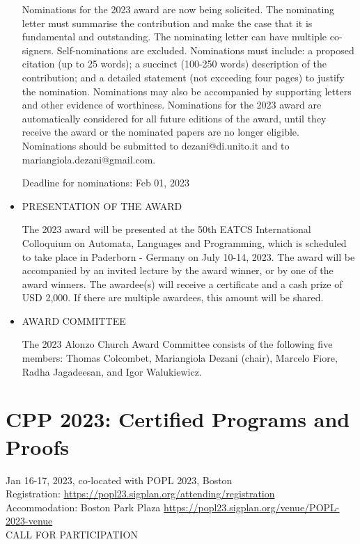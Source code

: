 \documentclass[prodmode,acmtecs]{acmsmall} %
\begin{document}
\begin{itemize}
  Nominations for the 2023 award are now being solicited. The nominating letter must summarise the contribution and make the case that it is fundamental and outstanding. The nominating letter can have multiple co-signers. Self-nominations are excluded. Nominations must include: a proposed citation (up to 25 words); a succinct (100-250 words) description of the contribution; and a detailed statement (not exceeding four pages) to justify the nomination. Nominations may also be accompanied by supporting letters and other evidence of worthiness. Nominations for the 2023 award are automatically considered for all future editions of the award, until they receive the award or the nominated papers are no longer eligible. Nominations should be submitted to dezani@di.unito.it and to mariangiola.dezani@gmail.com. 
 
Deadline for nominations: Feb 01, 2023 
 
\item  PRESENTATION OF THE AWARD 
 
  The 2023 award will be presented at the 50th EATCS International Colloquium on Automata, Languages and Programming, which is scheduled to take place in Paderborn - Germany on July 10-14, 2023. The award will be accompanied by an invited lecture by the award winner, or by one of the award winners. The awardee(s) will receive a certificate and a cash prize of USD 2,000. If there are multiple awardees, this amount will be shared.  
 
\item  AWARD COMMITTEE 
 
  The 2023 Alonzo Church Award Committee consists of the following five members: Thomas Colcombet, Mariangiola Dezani (chair), Marcelo Fiore, Radha Jagadeesan, and Igor Walukiewicz. 
 
\end{itemize}\section{CPP 2023: Certified Programs and Proofs}\label{CPP2023}  Jan 16-17, 2023, co-located with POPL 2023, Boston\\ 
  Registration: \href{https://popl23.sigplan.org/attending/registration}{https://popl23.sigplan.org/attending/registration}\\ 
  Accommodation: Boston Park Plaza \href{https://popl23.sigplan.org/venue/POPL-2023-venue}{https://popl23.sigplan.org/venue/POPL-2023-venue}\\ 
CALL FOR PARTICIPATION 
\end{document}
